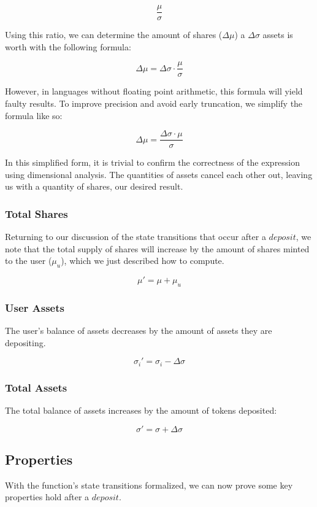 \documentclass{article}
\begin{document}
$$ \frac{\mu}{\sigma} $$

Using this ratio, we can determine the amount of shares ($\Delta\mu$) a $\Delta\sigma$ assets is worth with the following formula:

$$ \Delta\mu = \Delta\sigma \cdot \frac{\mu}{\sigma} $$

However, in languages without floating point arithmetic, this formula will yield faulty results. To improve precision and avoid early truncation, we simplify the formula like so:

$$ \Delta\mu = \frac{\Delta\sigma \cdot \mu}{\sigma} $$

In this simplified form, it is trivial to confirm the correctness of the expression using dimensional analysis. The quantities of assets cancel each other out, leaving us with a quantity of shares, our desired result.

\subsubsection{Total Shares}

Returning to our discussion of the state transitions that occur after a $deposit$, we note that the total supply of shares will increase by the amount of shares minted to the user ($\mu_{u}$), which we just described how to compute.

$$ \mu' = \mu + \mu_{u} $$

\subsubsection{User Assets}

The user's balance of assets decreases by the amount of assets they are depositing.

$$ \sigma_i' = \sigma_i - \Delta\sigma $$

\subsubsection{Total Assets}

The total balance of assets increases by the amount of tokens deposited:

$$ \sigma' = \sigma + \Delta\sigma $$

\subsection{Properties}

With the function's state transitions formalized, we can now prove some key properties hold after a $deposit$.
\end{document}
